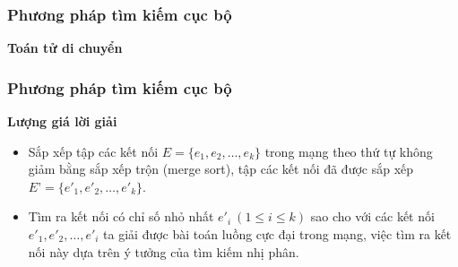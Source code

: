 \begin{frame}
    \frametitle{Phương pháp tìm kiếm cục bộ}

    \textbf{Toán tử di chuyển}

    \begin{figure}[h!]
        \centering
        \hspace{1cm}
    \end{figure}
\end{frame}

\begin{frame}
    \frametitle{Phương pháp tìm kiếm cục bộ}

    \textbf{Lượng giá lời giải}

    \begin{itemize}
        \item Sắp xếp tập các kết nối $E = \{e_1, e_2,…, e_k\}$ trong mạng theo thứ tự không giảm bằng sắp xếp trộn (merge sort), tập các kết nối đã được sắp xếp $E’ = \{e'_1, e'_2,…, e'_k\}$.
        \item Tìm ra kết nối có chỉ  số nhỏ nhất $e'_i ~(1 \leq i \leq k)$ sao cho với các kết nối $e'_1, e'_2, …, e'_i$ ta giải được bài toán luồng cực đại trong mạng, việc tìm ra kết nối này dựa trên ý tưởng của tìm kiếm nhị phân.
    \end{itemize}
\end{frame}



